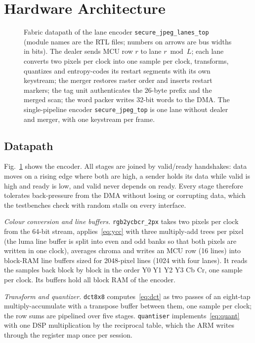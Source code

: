 \section{Hardware Architecture}\label{sec:hardware}
\begin{figure}[t]
\centering
\resizebox{\textwidth}{!}{}
\caption{Fabric datapath of the lane encoder \texttt{secure\_jpeg\_lanes\_top} (module names are the RTL files; numbers on arrows are bus widths in bits). The dealer sends MCU row $r$ to lane $r \bmod L$; each lane converts two pixels per clock into one sample per clock, transforms, quantizes and entropy-codes its restart segments with its own keystream; the merger restores raster order and inserts restart markers; the tag unit authenticates the 26-byte prefix and the merged scan; the word packer writes 32-bit words to the DMA. The single-pipeline encoder \texttt{secure\_jpeg\_top} is one lane without dealer and merger, with one keystream per frame.}
\label{fig:pl}
\end{figure}

\subsection{Datapath}\label{sec:datapath}
Fig.~\ref{fig:pl} shows the encoder. All stages are joined by valid/ready handshakes: data moves on a rising edge where both are high, a sender holds its data while valid is high and ready is low, and valid never depends on ready. Every stage therefore tolerates back-pressure from the DMA without losing or corrupting data, which the testbenches check with random stalls on every interface.

\textit{Colour conversion and line buffers.} \texttt{rgb2ycbcr\_2px} takes two pixels per clock from the 64-bit stream, applies~\eqref{eq:ycc} with three multiply-add trees per pixel (the luma line buffer is split into even and odd banks so that both pixels are written in one clock), averages chroma and writes an MCU row (16 lines) into block-RAM line buffers sized for 2048-pixel lines (1024 with four lanes). It reads the samples back block by block in the order Y0 Y1 Y2 Y3 Cb Cr, one sample per clock. Its buffers hold all block RAM of the encoder.

\textit{Transform and quantizer.} \texttt{dct8x8} computes~\eqref{eq:dct} as two passes of an eight-tap multiply-accumulate with a transpose buffer between them, one sample per clock; the row sums are pipelined over five stages. \texttt{quantiser} implements~\eqref{eq:quant} with one DSP multiplication by the reciprocal table, which the ARM writes through the register map once per session.

